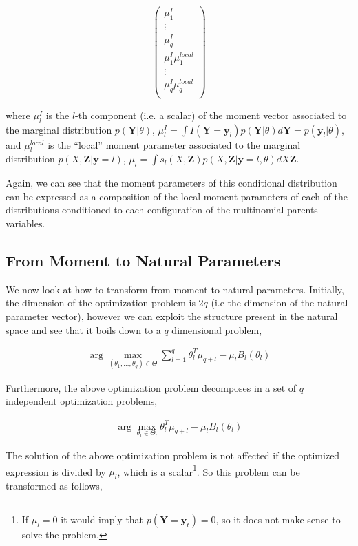 \documentclass[11pt, oneside]{article}   	%
\newcommand{\bm}{\mathbf}
\numberwithin{figure}{section}
\numberwithin{equation}{section}
\numberwithin{table}{section}
\theoremstyle{definition}
\begin{document}
$$ 
\begin{pmatrix}
\mu^{I}_1  \\
\vdots \\
\mu^{I}_q \\
\mu^{I}_1 \mu^{local}_1\\
\vdots \\
\mu^{I}_q \mu^{local}_q\\
\end{pmatrix}
$$

\noindent where  $\mu^{I}_l$ is the $l$-th component (i.e. a scalar) of the moment vector associated to the marginal distribution $p(\bm Y|\theta)$,  $\mu^{I}_l  = \int I(\bm Y = \bm y_l) p(\bm Y|\theta) d\bm Y= p(\bm y_l|\theta)$, and $\mu^{local}_l$  is the ``local'' moment parameter associated to the marginal distribution $p(X,\bm Z| \bm y = l)$, $\mu_l = \int s_l(X, \bm Z)p(X,\bm Z|\bm y = l, \theta) dX\bm Z$. 

Again, we can see that the moment parameters of this conditional distribution can be expressed as a composition of the local moment parameters of each of the distributions conditioned to each configuration of the multinomial parents variables. 

\subsection{From Moment to Natural Parameters}
\label{Section:CD_With_MParents:MomentToNatural}

We now look at how to transform from moment to natural parameters. Initially, the dimension of the optimization problem is $2q$ (i.e the dimension of the natural parameter vector), however we can exploit the structure present in the natural space and see that it boils down to a $q$ dimensional problem, 

\begin{eqnarray*}
\arg\max_{(\theta_1,\ldots, \theta_q) \in \Theta} \sum_{l=1}^q \theta_l^T \mu_{q+l}- \mu_l B_l(\theta_l)
\end{eqnarray*}

Furthermore, the above optimization problem decomposes in a set of $q$ independent optimization problems, 

\begin{eqnarray*}
\arg\max_{\theta_l \in \Theta_l} \theta_l^T \mu_{q+l}- \mu_l B_l(\theta_l)
\end{eqnarray*}

The solution of the above optimization problem is not affected if the optimized expression is divided by $\mu_l$, which is a scalar\footnote{If $\mu_l=0$ it would imply that $p(\bm Y= \bm y_t)=0$, so it does not make sense to solve the problem.}. So this problem can be transformed as follows, 
\end{document}
